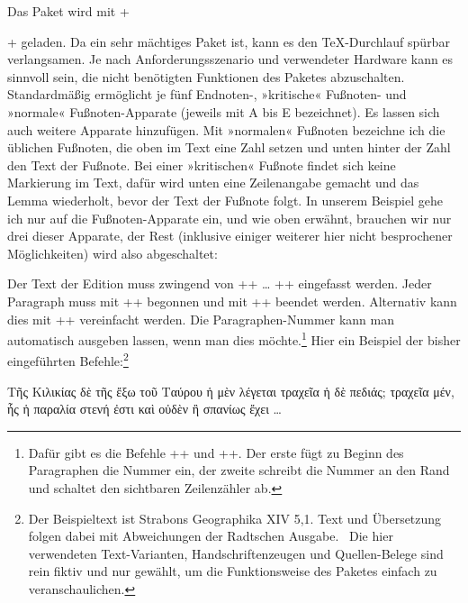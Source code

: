 Das Paket wird mit +\usepackage[<opt>]{reledmac}+ geladen. Da \reledmac ein sehr mächtiges Paket ist, kann es den \TeX-Durchlauf spürbar verlangsamen. Je nach Anforderungsszenario und verwendeter Hardware kann es sinnvoll sein, die nicht benötigten Funktionen des Paketes abzuschalten. Standardmäßig ermöglicht \reledmac je fünf Endnoten-, »kritische« Fußnoten- und »normale« Fußnoten-Apparate 
(jeweils mit A bis E bezeichnet). Es lassen sich auch weitere Apparate hinzufügen. Mit »normalen« Fußnoten bezeichne ich die üblichen Fußnoten, die oben im Text eine Zahl setzen 
und unten hinter der Zahl den Text der Fußnote. Bei einer »kritischen« Fußnote findet sich keine Markierung im Text, dafür wird 
unten eine Zeilenangabe gemacht und das Lemma wiederholt, bevor der Text der Fußnote folgt. In unserem Beispiel gehe ich nur auf die Fußnoten-Apparate ein, und wie oben erwähnt, brauchen wir nur drei dieser Apparate, der Rest 
(inklusive einiger weiterer hier nicht besprochener Möglichkeiten) wird also abgeschaltet:

\begin{lfgwcode}{}
\usepackage[%
  series={A,B,C},%
  noend,         %
  noeledsec,     %
  noledgroup     %
]{reledmac}
\end{lfgwcode}

Der Text der Edition muss zwingend von +\beginnumbering+ \dots{} +\endnumbering+ 
eingefasst werden. Jeder Paragraph muss mit +\pstart+ begonnen und mit +\pend+ beendet 
werden. Alternativ kann dies mit +\autopar+ vereinfacht werden. \cite[17]{reledmac} Die Paragraphen-Nummer kann man automatisch ausgeben lassen, wenn man dies 
möchte.\footnote{Dafür gibt es die Befehle +\numberpstarttrue+ und +\sidepstartnumtrue+. 
  Der erste fügt zu Beginn des Paragraphen die Nummer ein, der zweite schreibt die Nummer an 
den Rand und schaltet den sichtbaren Zeilenzähler ab.} 
Hier ein Beispiel der bisher eingeführten Befehle:\footnote{Der Beispieltext ist Strabons Geographika XIV 5,1. 
Text und Übersetzung folgen dabei mit Abweichungen der Radtschen Ausgabe.~\cite[96\psq]{radt:strabon4} 
Die hier verwendeten Text-Varianten, Handschriftenzeugen und Quellen-Belege sind rein 
fiktiv und nur gewählt, um die Funktionsweise des Paketes \reledmac einfach zu veranschaulichen.}

\begin{lfgwcode}{}
\beginnumbering
{}
Τῆς Κιλικίας δὲ τῆς ἔξω τοῦ Ταύρου ἡ μὲν λέγεται τραχεῖα ἡ δὲ πεδιάς;
τραχεῖα μέν, ἧς ἡ παραλία στενή ἐστι καὶ οὐδὲν ἢ σπανίως ἔχει \dots{}
\pend
\endnumbering
\end{lfgwcode}


